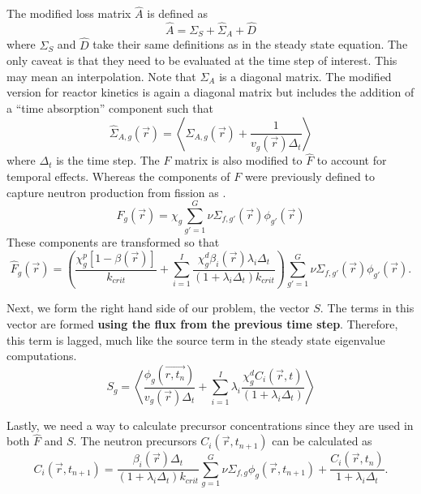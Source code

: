 \documentclass[12pt]{report}
\begin{document}
	The modified loss matrix $\hat{A}$ is defined as
	\begin{equation}
	\hat{A} = \Sigma_S + \hat{\Sigma}_A + \hat{D}
	\end{equation}
	where $\Sigma_S$ and $\hat{D}$ take their same definitions as in the steady state equation. The only caveat is that they need to be evaluated at the time step of interest. This may mean an interpolation. Note that $\Sigma_A$ is a diagonal matrix. The modified version for reactor kinetics is again a diagonal matrix but includes the addition of a ``time absorption'' component such that
	\begin{equation}
	\hat{\Sigma}_{A,g}(\vec{r}) = \left\langle \Sigma_{A,g}(\vec{r}) + \frac{1}{v_g(\vec{r}) \Delta_t} \right\rangle
	\end{equation}
	where $\Delta_t$ is the time step. The $F$ matrix is also modified to $\hat{F}$ to account for temporal effects. Whereas the components of $F$ were previously defined to capture neutron production from fission as
	. 
	\begin{equation}
	F_g(\vec{r}) = \chi_g \sum_{g'=1}^{G} \nu \Sigma_{f,g'}(\vec{r}) \phi_{g'}(\vec{r})
	\end{equation}
	These components are transformed so that
	\begin{equation}
	\hat{F}_g(\vec{r}) = \left(\frac{\chi^p_g\left[1- \beta(\vec{r})\right]}{k_{crit}} +  \sum_{i=1}^I \frac{\chi^d_g\beta_i(\vec{r}) \lambda_i \Delta_t}{(1+\lambda_i \Delta_t) k_{crit}} \right) \sum_{g'=1}^{G} \nu \Sigma_{f,g'}(\vec{r}) \phi_{g'}(\vec{r}).
	\end{equation}
	
	Next, we form the right hand side of our problem, the vector $S$. The terms in this vector are formed \textbf{using the flux from the previous time step}. Therefore, this term is lagged, much like the source term in the steady state eigenvalue computations.
	\begin{equation}
	S_g = \left\langle \frac{\phi_g(\vec{r,t_n})}{v_g(\vec{r}) \Delta_t} +  \sum_{i=1}^I \lambda_i \frac{\chi^d_g C_i(\vec{r},t)}{(1+\lambda_i \Delta_t)} \right\rangle
	\end{equation}
	
	Lastly, we need a way to calculate precursor concentrations since they are used in both $\hat{F}$ and $S$. The neutron precursors $C_i(\vec{r},t_{n+1})$ can be calculated as
	\begin{equation}
	C_i(\vec{r},t_{n+1}) = \frac{\beta_i(\vec{r}) \Delta_t}{(1 + \lambda_i \Delta_t) k_{crit}} \sum_{g=1}^{G} \nu \Sigma_{f,g} \phi_g (\vec{r},t_{n+1})  + \frac{C_i(\vec{r}, t_n)}{1+\lambda_i \Delta_t}.
	\end{equation}
	
\end{document}
